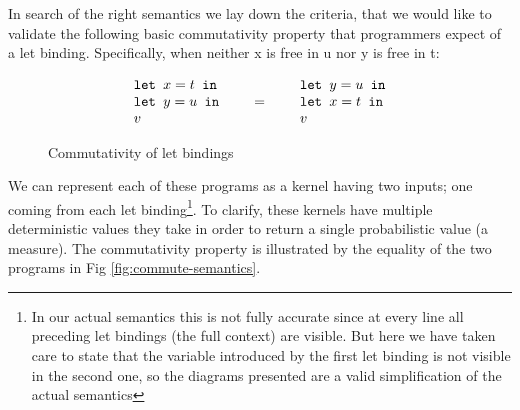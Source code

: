 In search of the right semantics we lay down the criteria, that
we would like to validate the following basic commutativity property that programmers expect of a let binding.
Specifically, when neither x is free in u nor y is free in t:
\begin{figure}[tb]
\[
\begin{array}{c@{\qquad=\qquad}c}
\begin{array}{l}
\texttt{let } x = t \texttt{ in}\\
\texttt{let } y = u \texttt{ in}\\
v
\end{array}
&
\begin{array}{l}
\texttt{let } y = u \texttt{ in}\\
\texttt{let } x = t \texttt{ in}\\
v
\end{array}
\end{array}
\]
    \caption{Commutativity of let bindings}
    \label{fig:commute-syntax}
\end{figure}


We can represent each of these programs as a kernel having two inputs; one coming from each let binding\footnote{In our actual semantics this is not fully accurate since at every line all preceding
let bindings (the full context) are visible. But here we have taken care to state that the variable introduced by the first let binding is not visible in the second one, so the diagrams presented are a valid
simplification of the actual semantics}.
To clarify, these kernels have multiple deterministic values they take in order to return a single probabilistic value (a measure).
The commutativity property is illustrated by the equality of the two programs in Fig \ref{fig:commute-semantics}.

